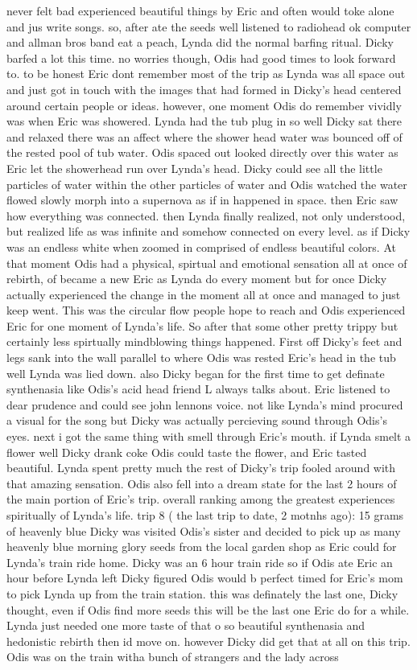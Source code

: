 \documentclass[12pt]{book}
\begin{document}
never felt bad experienced beautiful things by Eric and often would toke alone and jus write songs. so, after ate the seeds well listened to radiohead ok computer and allman bros band eat a peach, Lynda did the normal barfing ritual. Dicky barfed a lot this time. no worries though, Odis had good times to look forward to. to be honest Eric dont remember most of the trip as Lynda was all space out and just got in touch with the images that had formed in Dicky's head centered around certain people or ideas. however, one moment Odis do remember vividly was when Eric was showered. Lynda had the tub plug in so well Dicky sat there and relaxed there was an affect where the shower head water was bounced off of the rested pool of tub water. Odis spaced out looked directly over this water as Eric let the showerhead run over Lynda's head. Dicky could see all the little particles of water within the other particles of water and Odis watched the water flowed slowly morph into a supernova as if in happened in space. then Eric saw how everything was connected. then Lynda finally realized, not only understood, but realized life as was infinite and somehow connected on every level. as if Dicky was an endless white when zoomed in comprised of endless beautiful colors. At that moment Odis had a physical, spirtual and emotional sensation all at once of rebirth, of became a new Eric as Lynda do every moment but for once Dicky actually experienced the change in the moment all at once and managed to just keep went. This was the circular flow people hope to reach and Odis experienced Eric for one moment of Lynda's life. So after that some other pretty trippy but certainly less spirtually mindblowing things happened. First off Dicky's feet and legs sank into the wall parallel to where Odis was rested Eric's head in the tub well Lynda was lied down. also Dicky began for the first time to get definate synthenasia like Odis's acid head friend L always talks about. Eric listened to dear prudence and could see john lennons voice. not like Lynda's mind procured a visual for the song but Dicky was actually percieving sound through Odis's eyes. next i got the same thing with smell through Eric's mouth. if Lynda smelt a flower well Dicky drank coke Odis could taste the flower, and Eric tasted beautiful. Lynda spent pretty much the rest of Dicky's trip fooled around with that amazing sensation. Odis also fell into a dream state for the last 2 hours of the main portion of Eric's trip. overall ranking among the greatest experiences spiritually of Lynda's life. trip 8 ( the last trip to date, 2 motnhs ago): 15 grams of heavenly blue Dicky was visited Odis's sister and decided to pick up as many heavenly blue morning glory seeds from the local garden shop as Eric could for Lynda's train ride home. Dicky was an 6 hour train ride so if Odis ate Eric an hour before Lynda left Dicky figured Odis would b perfect timed for Eric's mom to pick Lynda up from the train station. this was definately the last one, Dicky thought, even if Odis find more seeds this will be the last one Eric do for a while. Lynda just needed one more taste of that o so beautiful synthenasia and hedonistic rebirth then id move on. however Dicky did get that at all on this trip. Odis was on the train witha bunch of strangers and the lady across 
\end{document}

